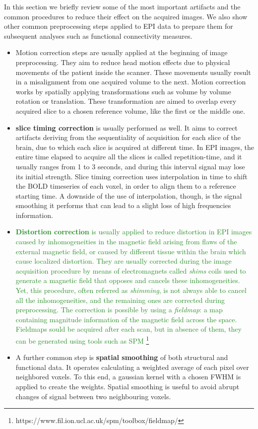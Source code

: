 \documentclass[11pt]{report}
\begin{document}
In this section we briefly review some of the most important artifacts and the common procedures to reduce their effect on the acquired images.
We also show other common preprocessing steps applied to EPI data to prepare them for subsequent analyses such as functional connectivity measures.
\begin{itemize}

\item Motion correction steps are usually applied at the beginning of image preprocessing.
They aim to reduce head motion effects due to physical movements of the patient inside the scanner.
These movements usually result in a misalignment from one acquired volume to the next.
Motion correction works by spatially applying transformations such as volume by volume rotation or translation.
These transformation are aimed to overlap every acquired slice to a chosen reference volume, like the first or the middle one.


\item \textbf{slice timing correction} is usually performed as well. It aims to correct artifacts deriving from the sequentiality of acquisition for each slice of the brain, due to which each slice is acquired at different time.
In EPI images, the entire time elapsed to acquire all the slices is called repetition-time, and it usually ranges from 1 to 3 seconds, and during this interval signal may lose its initial strength.
Slice timing correction uses interpolation in time to shift the BOLD timeseries of each voxel, in order to align them to a reference starting time.
A downside of the use of interpolation, though, is the signal smoothing it performs that can lead to a slight loss of high frequencies information.

\item  \textcolor{ForestGreen}{\textbf{Distortion correction} is usually applied to reduce distortion in EPI images caused by inhomogeneities in the magnetic field arising from flaws of the external magnetic field, or caused by different tissue within the brain which cause localized distortion.
They are usually corrected during the image acquisition procedure by means of electromagnets called \emph{shims} coils used to generate a magnetic field that opposes and cancels these inhomogeneities.
Yet, this procedure, often referred as \emph{shimming}, is not always able to cancel all the inhomogeneities, and the remaining ones are corrected during preprocessing.
The correction is possible by using a \emph{fieldmap}: a map containing magnitude information of the magnetic field across the space.
Fieldmaps sould be acquired after each scan, but in absence of them, they can be generated using tools such as SPM
\footnote{https://www.fil.ion.ucl.ac.uk/spm/toolbox/fieldmap/}
}
\item A further common step is \textbf{spatial smoothing} of both structural and functional data. It operates calculating a weighted average of each pixel over neighbored voxels. To this end, a gaussian kernel with a chosen FWHM is applied to create the weights.
Spatial smoothing is useful to avoid abrupt changes of signal between two neighbouring voxels.


\end{itemize}
\end{document}
